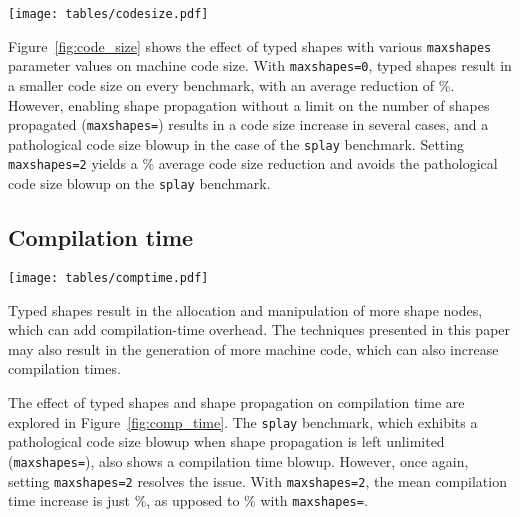 \documentclass[preprint]{sigplanconf}
\newcommand{\percentstat}[1]{\unskip\%}
\begin{document}
\begin{figure*}[tb]
    \begin{center}
    \texttt{[image: tables/codesize.pdf]}
    \end{center}
\caption{Code size relative to inline cache baseline\label{fig:code_size}}
\end{figure*}

Figure~\ref{fig:code_size} shows the effect of typed shapes with various
{\tt maxshapes} parameter values on machine code size. With
{\tt maxshapes=0}, typed shapes result in a smaller code size on every
benchmark, with an average reduction of
\percentstat{codesize_decr_maxshapes0}. However, enabling shape propagation
without a limit on the number of shapes propagated ({\tt maxshapes=})
results in a code size increase in several cases, and a pathological code
size blowup in the case of the {\tt splay} benchmark. Setting {\tt maxshapes=2}
yields a \percentstat{codesize_decr_maxshapes2} average code size reduction
and avoids the pathological code size blowup on the {\tt splay} benchmark.

\subsection{Compilation time}

\begin{figure*}[tb]
    \begin{center}
    \texttt{[image: tables/comptime.pdf]}
    \end{center}
\caption{Compilation time relative to inline cache baseline\label{fig:comp_time}}
\end{figure*}

Typed shapes result in the allocation and manipulation of more shape nodes,
which can add compilation-time overhead. The techniques
presented in this paper may also result in the generation of more
machine code, which can also increase compilation times. 

The effect of typed shapes and shape propagation on compilation time are
explored in Figure~\ref{fig:comp_time}. The {\tt splay} benchmark, which
exhibits a pathological code size blowup when shape propagation is left
unlimited ({\tt maxshapes=}), also shows a compilation time blowup.
However, once again, setting {\tt maxshapes=2} resolves the issue.
With {\tt maxshapes=2}, the mean compilation time increase is just
\percentstat{comptime_incr_maxshapes2}, as upposed to
\percentstat{comptime_incr_maxshapesinfty} with {\tt maxshapes=}.
\end{document}

